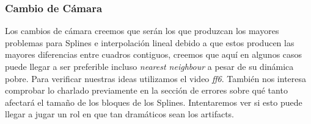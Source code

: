 \subsubsection{Cambio de Cámara}

Los cambios de cámara creemos que serán los que produzcan los mayores problemas para Splines e interpolación lineal debido a que estos producen las mayores diferencias entre cuadros contiguos, creemos que aquí en algunos casos puede llegar a ser preferible incluso \textit{nearest neighbour} a pesar de su dinámica pobre. Para verificar nuestras ideas utilizamos el video \textit{ff6}.
También nos interesa comprobar lo charlado previamente en la sección de errores sobre qué tanto afectará el tamaño de los bloques de los Splines. Intentaremos ver si esto puede llegar a jugar un rol en que tan dramáticos sean los artifacts.



